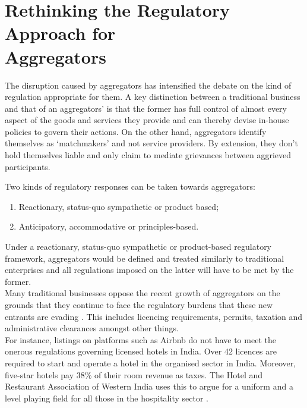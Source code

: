 \documentclass[a4paper, 12pt]{article}
\begin{document}
\section{Rethinking the Regulatory Approach for \\Aggregators}
The disruption caused by aggregators has intensified the debate on the kind of regulation appropriate for them. A key distinction between a traditional business and that of an aggregators’ is that the former has full control of almost every aspect of the goods and services they provide and can thereby devise in-house policies to govern their actions. On the other hand, aggregators identify themselves as ‘matchmakers’ and not service providers. By extension, they don't hold themselves liable and only claim to mediate grievances between aggrieved participants. 
          
             Two kinds of regulatory responses can be taken towards aggregators:         
                    \begin{enumerate}
                      \item  Reactionary, status-quo sympathetic or product based;
                      \item Anticipatory, accommodative or principles-based.
                    \end{enumerate}
                    
                 Under a reactionary, status-quo sympathetic or product-based regulatory framework, aggregators would be defined and treated similarly to traditional enterprises and all regulations imposed on the latter will have to be met by the former. \\
Many traditional businesses oppose the recent growth of aggregators on the grounds that they continue to face the regulatory burdens that these new entrants are evading \parencite{koopman2014sharing}. This includes licencing requirements, permits, taxation and administrative clearances amongst other things. \\

For instance, listings on platforms such as Airbnb do not have to meet the onerous regulations governing licensed hotels in India. Over 42 licences are required to start and operate a hotel in the organised sector in India. Moreover, five-star hotels pay 38\% of their room revenue as taxes. The Hotel and Restaurant Association of Western India uses this to argue for a uniform and a level playing field for all those in the hospitality sector \parencite{Chaturvedinews}.\\
\end{document}
